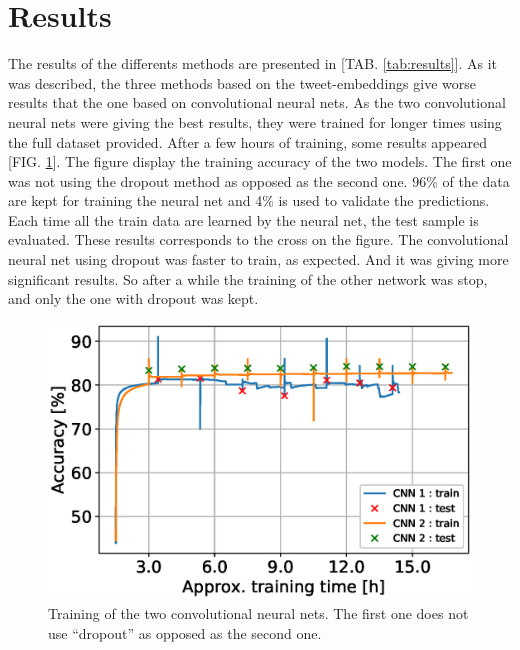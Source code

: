 \section{Results}
The results of the differents methods are presented in [TAB. \ref{tab:results}]. As it was described, the three methods based on the tweet-embeddings give worse results that the one based on convolutional neural nets.
As the two convolutional neural nets were giving the best results, they were trained for longer times using the full dataset provided. After a few hours of training, some results appeared [FIG. \ref{plot:CNNaccuracy}]. The figure display the training accuracy of the two models. The first one was not using the dropout method as opposed as the second one. 96\% of the data are kept for training the neural net and 4\% is used to validate the predictions. Each time all the train data are learned by the neural net, the test sample is evaluated. These results corresponds to the cross on the figure. The convolutional neural net using dropout was faster to train, as expected. And it was giving more significant results. So after a while the training of the other network was stop, and only the one with dropout was kept. 

\label{sec:results}
\begin{figure}[h!]
\centering
	\includegraphics[scale=0.6]{CNNaccuracy} 
\caption{Training of the two convolutional neural nets. The first one does not use ``dropout'' as opposed as the second one.}
\label{plot:CNNaccuracy}
\end{figure}
\FloatBarrier


